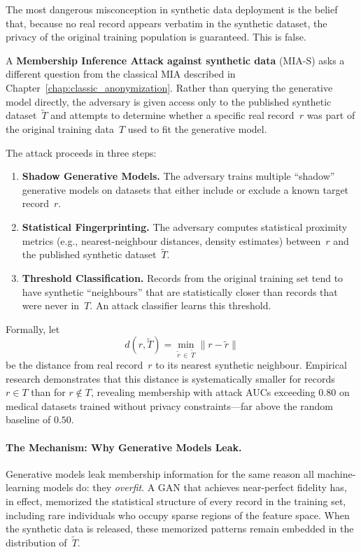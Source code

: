 The most dangerous misconception in synthetic data deployment is the
belief that, because no real record appears verbatim in the synthetic
dataset, the privacy of the original training population is
guaranteed.
This is false.

A \textbf{Membership Inference Attack against synthetic data}
(MIA-S) asks a different question from the classical MIA described in
Chapter~\ref{chap:classic_anonymization}.
Rather than querying the generative model directly, the adversary is
given access only to the published synthetic dataset~$\tilde{T}$ and
attempts to determine whether a specific real record~$r$ was part of
the original training data~$T$ used to fit the generative model.

The attack proceeds in three steps:

\begin{enumerate}
  \item \textbf{Shadow Generative Models.}
    The adversary trains multiple ``shadow'' generative models on
    datasets that either include or exclude a known target record~$r$.

  \item \textbf{Statistical Fingerprinting.}
    The adversary computes statistical proximity metrics
    (e.g., nearest-neighbour distances, density estimates) between~$r$
    and the published synthetic dataset~$\tilde{T}$.

  \item \textbf{Threshold Classification.}
    Records from the original training set tend to have synthetic
    ``neighbours'' that are statistically closer than records that
    were never in~$T$.
    An attack classifier learns this threshold.
\end{enumerate}

Formally, let
\begin{equation}
  d\!\left(r,\tilde{T}\right)
    = \min_{\tilde{r}\,\in\,\tilde{T}} \|r - \tilde{r}\|
\end{equation}
be the distance from real record~$r$ to its nearest synthetic
neighbour.
Empirical research demonstrates that this distance is systematically
smaller for records $r \in T$ than for $r \notin T$, revealing
membership with attack AUCs exceeding $0.80$ on medical datasets
trained without privacy constraints---far above the random baseline
of $0.50$.

\paragraph{The Mechanism: Why Generative Models Leak.}
Generative models leak membership information for the same reason all
machine-learning models do: they \emph{overfit}.
A GAN that achieves near-perfect fidelity has, in effect, memorized
the statistical structure of every record in the training set,
including rare individuals who occupy sparse regions of the feature
space.
When the synthetic data is released, these memorized patterns remain
embedded in the distribution of~$\tilde{T}$.


